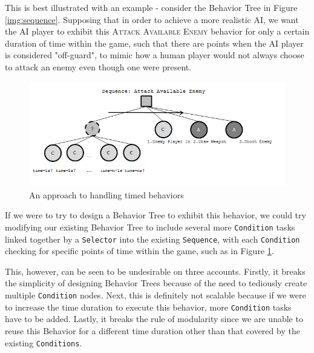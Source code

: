             This is best illustrated with an example - consider the Behavior Tree in Figure \ref{img:sequence}. Supposing that in order to achieve a more realistic AI, we want the AI player to exhibit this \textsc{Attack Available Enemy} behavior for only a certain duration of time within the game, such that there are points when the AI player is considered "off-guard", to mimic how a human player would not always choose to attack an enemy even though one were present.
            
            \begin{figure}[h]
                
                \begin{center}
                \includegraphics[scale=1.0]{images/badexample.png}
                \caption{An approach to handling timed behaviors}
                \label{img:badexample}
                \end{center}            
            \end{figure} 
            
            If we were to try to design a Behavior Tree to exhibit this behavior, we could try modifying our existing Behavior Tree to include several more \texttt{Condition} tasks linked together by a \texttt{Selector} into the existing \texttt{Sequence}, with each \texttt{Condition} checking for specific points of time within the game, such as in Figure \ref{img:badexample}. 
            
            This, however, can be seen to be undesirable on three accounts. Firstly, it breaks the simplicity of designing Behavior Trees because of the need to tediously create multiple \texttt{Condition} nodes. Next, this is definitely not scalable because if we were to increase the time duration to execute this behavior, more \texttt{Condition} tasks have to be added. Lastly, it breaks the rule of modularity since we are unable to reuse this Behavior for a different time duration other than that covered by the existing \texttt{Conditions}.
                       
